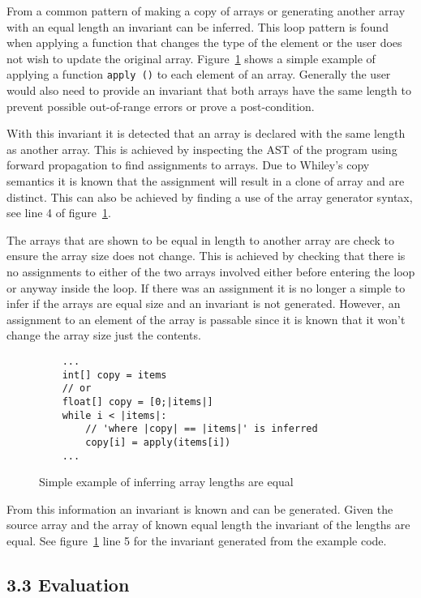 \documentclass[11pt, a4paper, twoside, openright]{report}
\newcommand{\code}[1]{\texttt{#1}}
\begin{document}
From a common pattern of making a copy of arrays or generating another array
with an equal length an invariant can be inferred.
This loop pattern is found when applying a function that changes the type of
the element or the user does not wish to update the original array.
Figure~\ref{lst:whiley-length} shows a simple example of applying a function
\code{apply ()} to each element of an array.
Generally the user would also need to provide an invariant that both arrays
have the same length to prevent possible out-of-range errors or prove a
post-condition.

With this invariant it is detected that an array is declared with the same
length as another array.
This is achieved by inspecting the AST of the program
using forward propagation to find assignments to arrays.
Due to Whiley's copy semantics it is known that the assignment will result
in a clone of array and are distinct.
This can also be achieved by finding a use of the array
generator syntax, see line 4 of figure~\ref{lst:whiley-length}.

The arrays that are shown to be equal in length to another array are
check to ensure the array size does not change.
This is achieved by checking that there is no assignments to either
of the two arrays involved either before entering the loop or
anyway inside the loop.
If there was an assignment it is no longer a simple to infer if
the arrays are equal size and an invariant is not generated.
However, an assignment to an element of the array is passable since it
is known that it won't change the array size just the contents.

\begin{figure}[h]
\begin{lstlisting}
    ...
    int[] copy = items
    // or
    float[] copy = [0;|items|]
    while i < |items|:
        // 'where |copy| == |items|' is inferred
        copy[i] = apply(items[i])
    ...
\end{lstlisting}
\caption{Simple example of inferring array lengths are equal}
\label{lst:whiley-length}
\end{figure}

From this information an invariant is known and can be generated.
Given the source array and the array of known equal length the
invariant of the lengths are equal.
See figure~\ref{lst:whiley-length} line 5 for the invariant generated
from the example code.

\subsection*{3.3 Evaluation}
\end{document}

